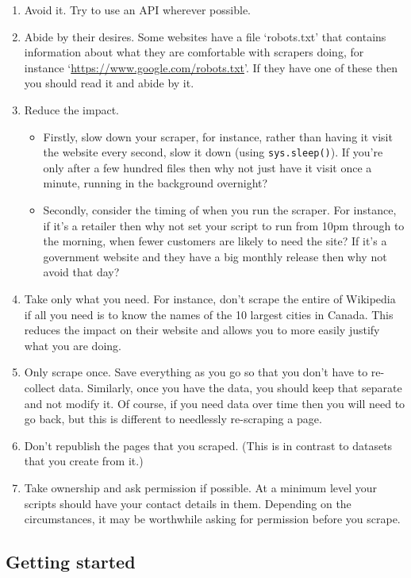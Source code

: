 \documentclass[
]{book}
\providecommand{\tightlist}{%
  \setlength{\itemsep}{0pt}\setlength{\parskip}{0pt}}
\begin{document}
\begin{enumerate}
\def\labelenumi{\arabic{enumi}.}
\tightlist
\item
  Avoid it. Try to use an API wherever possible.
\item
  Abide by their desires. Some websites have a file `robots.txt' that contains information about what they are comfortable with scrapers doing, for instance `\url{https://www.google.com/robots.txt}'. If they have one of these then you should read it and abide by it.
\item
  Reduce the impact.

  \begin{itemize}
  \tightlist
  \item
    Firstly, slow down your scraper, for instance, rather than having it visit the website every second, slow it down (using \texttt{sys.sleep()}). If you're only after a few hundred files then why not just have it visit once a minute, running in the background overnight?
  \item
    Secondly, consider the timing of when you run the scraper. For instance, if it's a retailer then why not set your script to run from 10pm through to the morning, when fewer customers are likely to need the site? If it's a government website and they have a big monthly release then why not avoid that day?
  \end{itemize}
\item
  Take only what you need. For instance, don't scrape the entire of Wikipedia if all you need is to know the names of the 10 largest cities in Canada. This reduces the impact on their website and allows you to more easily justify what you are doing.
\item
  Only scrape once. Save everything as you go so that you don't have to re-collect data. Similarly, once you have the data, you should keep that separate and not modify it. Of course, if you need data over time then you will need to go back, but this is different to needlessly re-scraping a page.
\item
  Don't republish the pages that you scraped. (This is in contrast to datasets that you create from it.)
\item
  Take ownership and ask permission if possible. At a minimum level your scripts should have your contact details in them. Depending on the circumstances, it may be worthwhile asking for permission before you scrape.
\end{enumerate}

\hypertarget{getting-started-3}{%
\subsection{Getting started}\label{getting-started-3}}
\end{document}
